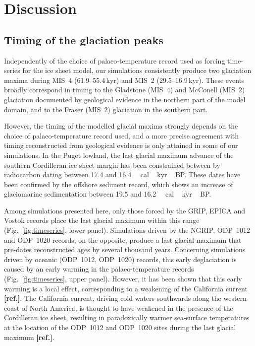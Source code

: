 \documentclass[tc, ms]{copernicus}
\newcommand{\aref}[0]{\textbf{[ref.]}}
\begin{document}
\section{Discussion}
\label{sec:discussion}

\subsection{Timing of the glaciation peaks}

Independently of the choice of palaeo-temperature record used as forcing
time-series for the ice sheet model, our simulations consistently produce two
glaciation maxima during MIS~4 (61.9--55.4\,\unit{kyr}) and MIS~2
(29.5--16.9\,\unit{kyr}). These events broadly correspond in timing to the
Gladstone (MIS~4) and McConell (MIS~2) glaciation documented by geological
evidence in the northern part of the model domain, and to the Fraser (MIS~2)
glaciation in the southern part.

However, the timing of the modelled glacial maxima strongly depends on the
choice of palaeo-temperature record used, and a more precise agreement with
timing reconstructed from geological evidence is only attained in some of our
simulations. In the Puget lowland, the last glacial maximum advance of the
southern Cordilleran ice sheet margin has been constrained between by
radiocarbon dating between 17.4 and 16.4\,\unit{\,cal\,kyr\,BP}.
These dates have been confirmed by the offshore sediment record, which shows an
increase of glaciomarine sedimentation between 19.5 and
16.2\,\unit{\,cal\,kyr\,BP}.

Among simulations presented here, only those forced by the GRIP, EPICA and
Vostok records place the last glacial maximum within this range
(Fig.~\ref{fig:timeseries}, lower panel). Simulations driven by the NGRIP,
ODP~1012 and ODP~1020 records, on the opposite, produce a last glacial maximum
that pre-dates reconstructed ages by several thousand years. Concerning
simulations driven by oceanic (ODP~1012, ODP~1020) records, this early
deglaciation is caused by an early warming in the palaeo-temperature records
(Fig.~\ref{fig:timeseries}, upper panel). However, it has been shown that this
early warming is a local effect, corresponding to a weakening of the California
current \aref. The California current, driving cold waters southwards
along the western coast of North America, is thought to have weakened in the
presence of the Cordilleran ice sheet, resulting in paradoxically warmer
sea-surface temperatures at the location of the ODP~1012 and ODP~1020 sites
during the last glacial maximum \aref.
\end{document}
